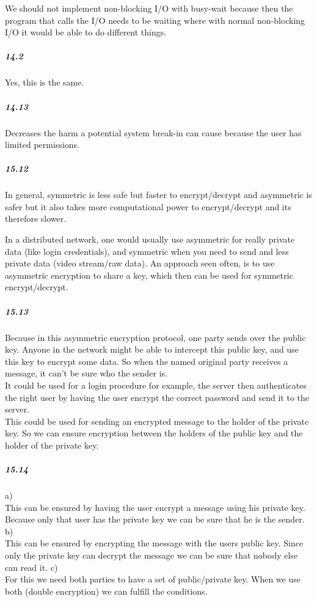\documentclass[]{article}
\begin{document}
We should not implement non-blocking I/O with busy-wait because then the program that calls the I/O needs to be waiting where with normal non-blocking I/O it would be able to do different things.\\

\subparagraph*{14.2}

Yes, this is the same.

\subparagraph*{14.13}

Decreases the harm a potential system break-in can cause because the user has limited permissions.

\subparagraph*{15.12}

In general, symmetric is less safe but faster to encrypt/decrypt and asymmetric is safer but it also takes more computational power to encrypt/decrypt and its therefore slower.

In a distributed network, one would usually use asymmetric for really private data (like login credentials), and symmetric when you need to send and less private data (video stream/raw data). An approach seen often, is to use asymmetric encryption 
to share a key, which then can be used for symmetric encrypt/decrypt.

\subparagraph*{15.13}

Because in this asymmetric encryption protocol, one party sends over the public key. Anyone in the network might be able to intercept this public key, and use this key to encrypt some data. So when the named original party receives a message, it can't be sure who the sender is.\\
It could be used for a login procedure for example, the server then authenticates the right user by having the user encrypt the correct password and send it to the server.\\

This could be used for sending an encrypted message to the holder of the private key. So we can ensure encryption between the holders of the public key and the holder of the private key.

\subparagraph*{15.14}

a)\\
This can be ensured by having the user encrypt a message using his private key. Because only that user has the private key we can be sure that he is the sender.
b)\\
This can be ensured  by encrypting the message with the users public key. Since only the private key can decrypt the message we can be sure that nobody else can read it.
c)\\
For this we need both parties to have a set of public/private key. When we use both (double encryption) we can fulfill the conditions.
\end{document}
